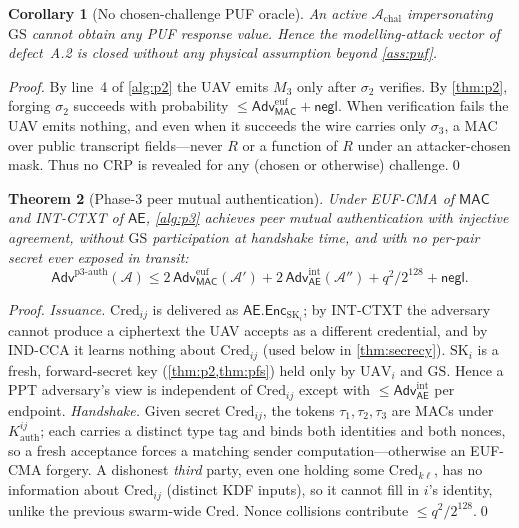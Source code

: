 \documentclass[11pt]{article}
\theoremstyle{plain}
\newtheorem{theorem}{Theorem}
\newtheorem{corollary}[theorem]{Corollary}
\theoremstyle{definition}
\newcommand{\GS}{\mathrm{GS}}
\newcommand{\UAV}{\mathrm{UAV}}
\newcommand{\Cred}{\mathrm{Cred}}
\newcommand{\SK}{\mathrm{SK}}
\newcommand{\MAC}{\mathsf{MAC}}
\newcommand{\aead}{\mathsf{AE}}
\newcommand{\Enc}{\mathsf{Enc}}
\newcommand{\adv}{\mathcal{A}}
\newcommand{\negl}{\mathsf{negl}}
\newcommand{\Adv}{\mathsf{Adv}}
\begin{document}
\begin{corollary}[No chosen-challenge PUF oracle]\label{cor:nooracle}
An active $\adv_{\mathrm{chal}}$ impersonating $\GS$ cannot obtain any PUF
response value. Hence the modelling-attack vector of defect~A.2 is closed
without any physical assumption beyond \cref{ass:puf}.
\end{corollary}
\begin{proof}
By line~4 of \cref{alg:p2} the UAV emits $M_3$ only after $\sigma_2$
verifies. By \cref{thm:p2}, forging $\sigma_2$ succeeds with probability
$\le\Adv^{\mathrm{euf}}_{\MAC}+\negl$. When verification fails the UAV emits
nothing, and even when it succeeds the wire carries only $\sigma_3$, a MAC
over public transcript fields---never $R$ or a function of $R$ under an
attacker-chosen mask. Thus no CRP is revealed for any (chosen or otherwise)
challenge.\qed
\end{proof}

\begin{theorem}[Phase-3 peer mutual authentication]\label{thm:p3}
Under EUF-CMA of $\MAC$ and INT-CTXT of $\aead$, \cref{alg:p3} achieves peer
mutual authentication with injective agreement, without $\GS$ participation
at handshake time, and with no per-pair secret ever exposed in transit:
\[
\Adv^{\mathrm{p3\text{-}auth}}(\adv)\le
2\,\Adv^{\mathrm{euf}}_{\MAC}(\adv')+
2\,\Adv^{\mathrm{int}}_{\aead}(\adv'')+q^2/2^{128}+\negl.
\]
\end{theorem}
\begin{proof}
\emph{Issuance.} $\Cred_{ij}$ is delivered as $\aead.\Enc_{\SK_i}$; by
INT-CTXT the adversary cannot produce a ciphertext the UAV accepts as a
different credential, and by IND-CCA it learns nothing about $\Cred_{ij}$
(used below in \cref{thm:secrecy}). $\SK_i$ is a fresh, forward-secret key
(\cref{thm:p2,thm:pfs}) held only by $\UAV_i$ and $\GS$. Hence a PPT
adversary's view is independent of $\Cred_{ij}$ except with
$\le\Adv^{\mathrm{int}}_{\aead}$ per endpoint. \emph{Handshake.} Given secret
$\Cred_{ij}$, the tokens $\tau_1,\tau_2,\tau_3$ are MACs under
$K^{ij}_{\mathrm{auth}}$; each carries a distinct type tag and binds both
identities and both nonces, so a fresh acceptance forces a matching sender
computation---otherwise an EUF-CMA forgery. A dishonest \emph{third} party,
even one holding some $\Cred_{k\ell}$, has no information about $\Cred_{ij}$
(distinct KDF inputs), so it cannot fill in $i$'s identity, unlike the
previous swarm-wide $\Cred$. Nonce collisions contribute $\le q^2/2^{128}$.\qed
\end{proof}
\end{document}
